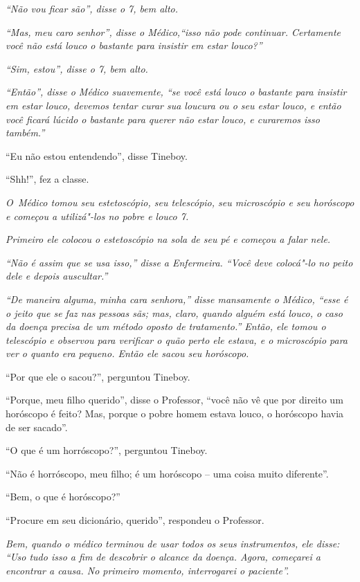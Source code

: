 \emph{``Não vou ficar são'', disse o 7, bem alto.}

\emph{``Mas, meu caro senhor'', disse o Médico,``isso não pode
continuar. Certamente você não está louco o bastante para insistir em
estar louco?''}

\emph{``Sim, estou'', disse o 7, bem alto.}

\emph{``Então'', disse o Médico suavemente, ``se você está louco o
bastante para insistir em estar louco, devemos tentar curar sua loucura
ou o seu estar louco, e então você ficará lúcido o bastante para querer
não estar louco, e curaremos isso também.''}

``Eu não estou entendendo'', disse Tineboy.

``Shh!'', fez a classe.

\emph{O~Médico tomou seu estetoscópio, seu telescópio, seu microscópio e
seu horóscopo e começou a utilizá"-los no pobre e louco 7.}

\emph{Primeiro ele colocou o estetoscópio na sola de seu pé e começou a
falar nele.}

\emph{``Não é assim que se usa isso,'' disse a Enfermeira. ``Você deve
colocá"-lo no peito dele e depois auscultar.''}

\emph{``De maneira alguma, minha cara senhora,'' disse mansamente o
Médico, ``esse é o jeito que se faz nas pessoas sãs; mas, claro, quando
alguém está louco, o caso da doença precisa de um método oposto de
tratamento.'' Então, ele tomou o telescópio e observou para verificar o
quão perto ele estava, e o microscópio para ver o quanto era pequeno.
Então ele sacou seu horóscopo.}

``Por que ele o sacou?'', perguntou Tineboy.

``Porque, meu filho querido'', disse o Professor, ``você não vê que por
direito um horóscopo é feito? Mas, porque o pobre homem estava louco, o
horóscopo havia de ser sacado''.

``O que é um horróscopo?'', perguntou Tineboy.

``Não é horróscopo, meu filho; é um horóscopo -- uma coisa muito
diferente''.

``Bem, o que é horóscopo?''

``Procure em seu dicionário, querido'', respondeu o Professor.

\emph{Bem, quando o médico terminou de usar todos os seus instrumentos,
ele disse: ``Uso tudo isso a fim de descobrir o alcance da doença.
Agora, começarei a encontrar a causa. No primeiro momento, interrogarei
o paciente''.}

